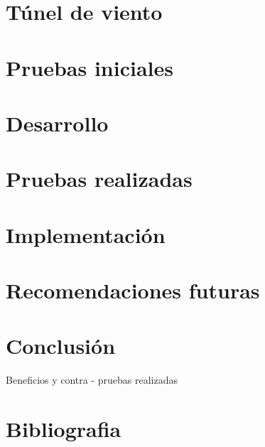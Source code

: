 \documentclass[12pt,a4paper]{article}
\begin{document}
	\section{Túnel de viento}
		

	\section{Pruebas iniciales}
	

	\section{Desarrollo}
	

	\section{Pruebas realizadas}
	

	\section{Implementación} 
	
	
	\section{Recomendaciones futuras}
	

	\section{Conclusión}
	
	
	Beneficios y  contra - pruebas realizadas
	
	\section{Bibliografia}

\printbibliography
\newpage
\end{document}
